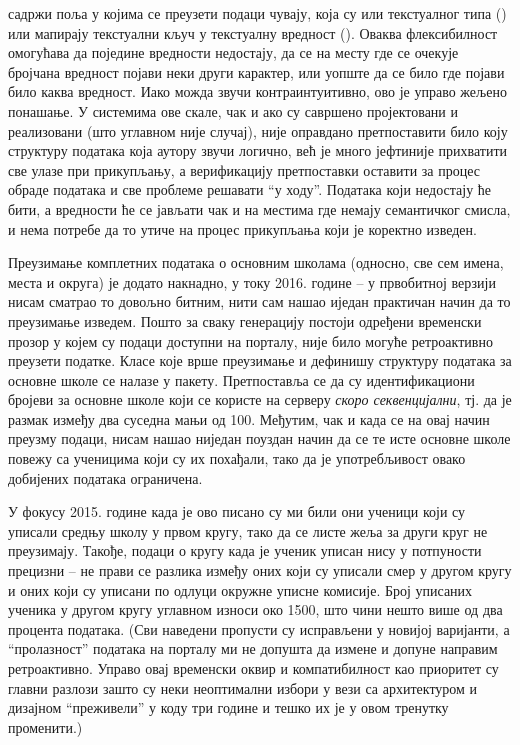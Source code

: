  садржи поља у којима се преузети подаци чувају, која су или текстуалног типа () или мапирају текстуални кључ у текстуалну вредност (). Оваква флексибилност омогућава да поједине вредности недостају, да се на месту где се очекује бројчана вредност појави неки други карактер, или уопште да се било где појави било каква вредност. Иако можда звучи контраинтуитивно, ово је управо жељено понашање. У системима ове скале, чак и ако су савршено пројектовани и реализовани (што углавном није случај), није оправдано претпоставити било коју структуру података која аутору звучи логично, већ је много јефтиније прихватити све улазе при прикупљању, а верификацију претпоставки оставити за процес обраде података и све проблеме решавати \enquote{у ходу}. Података који недостају ће бити, а вредности ће се јављати чак и на местима где немају семантичког смисла, и нема потребе да то утиче на процес прикупљања који је коректно изведен. 

Преузимање комплетних података о основним школама  (односно, све сем имена, места и округа) је додато накнадно, у току 2016. године -- у првобитној верзији нисам сматрао то довољно битним, нити сам нашао иједан практичан начин да то преузимање изведем. Пошто за сваку генерацију постоји одређени временски прозор у којем су подаци доступни на порталу, није било могуће ретроактивно преузети податке. Класе које врше преузимање и дефинишу структуру података за основне школе се налазе у  пакету. Претпоставља се да су идентификациони бројеви за основне школе који се користе на серверу \emph{скоро секвенцијални}, тј. да је размак између два суседна мањи од 100. Међутим, чак и када се на овај начин преузму подаци, нисам нашао ниједан поуздан начин да се те исте основне школе повежу са ученицима који су их похађали, тако да је употребљивост овако добијених података ограничена.

У фокусу 2015. године када је ово писано су ми били они ученици који су уписали средњу школу у првом кругу, тако да се листе жеља за други круг не преузимају. Такође, подаци о кругу када је ученик уписан нису у потпуности прецизни -- не прави се разлика између оних који су уписали смер у другом кругу и оних који су уписани по одлуци окружне уписне комисије. Број уписаних ученика у другом кругу углавном износи око 1500, што чини нешто више од два процента података. (Сви наведени пропусти су исправљени у новијој варијанти, а \enquote{пролазност} података на порталу ми не допушта да измене и допуне направим ретроактивно. Управо овај временски оквир и компатибилност као приоритет су главни разлози зашто су неки неоптимални избори у вези са архитектуром и дизајном \enquote{преживели} у коду три године и тешко их је у овом тренутку променити.)

